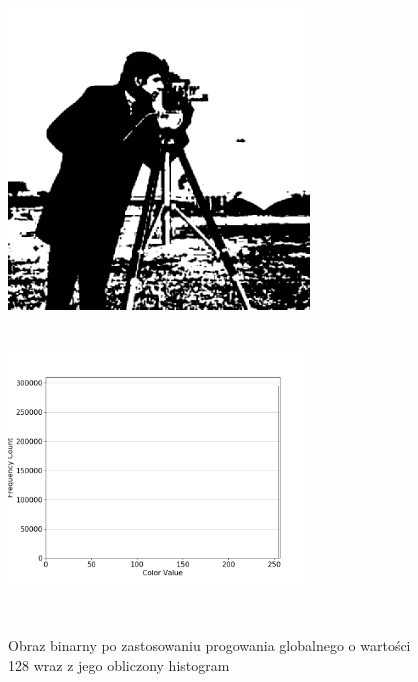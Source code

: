 \documentclass[a4paper,12pt]{book}
\begin{document}
\begin{figure}[H]
	\caption{Obraz binarny po zastosowaniu progowania globalnego o wartości 128 wraz z jego obliczony histogram}
	\includegraphics[width=8cm, height=8cm]{5-5/global-threshold-image-photoman-128.png}
	\includegraphics[width=8cm, height=8cm]{5-5/global-threshold-photoman-128.png}
\end{figure}
\end{document}
